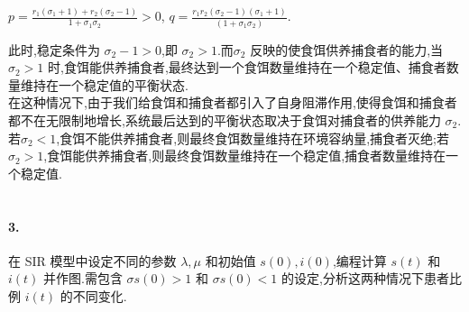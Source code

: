 \documentclass{article}
\begin{document}
    $p=\frac{r_1(\sigma_1 + 1)+r_2(\sigma_2-1)}{1+\sigma_1\sigma_2} > 0$, $q=\frac{r_1r_2(\sigma_2-1)(\sigma_1+1)}{(1+\sigma_1\sigma_2)}$.

    此时,稳定条件为 $\sigma_2-1 > 0$,即 $\sigma_2 > 1$.而$\sigma_2$ 反映的使食饵供养捕食者的能力,当 $\sigma_2 > 1$ 时,食饵能供养捕食者,最终达到一个食饵数量维持在一个稳定值、捕食者数量维持在一个稳定值的平衡状态.\\

    在这种情况下,由于我们给食饵和捕食者都引入了自身阻滞作用,使得食饵和捕食者都不在无限制地增长,系统最后达到的平衡状态取决于食饵对捕食者的供养能力 $\sigma_2$.若$\sigma_2 < 1$,食饵不能供养捕食者,则最终食饵数量维持在环境容纳量,捕食者灭绝;若$\sigma_2 > 1$,食饵能供养捕食者,则最终食饵数量维持在一个稳定值,捕食者数量维持在一个稳定值.\\
~\\

\paragraph{3.}在 SIR 模型中设定不同的参数 $\lambda, \mu$ 和初始值 $s(0), i(0)$,编程计算 $s(t)$ 和 $i(t)$ 并作图.需包含 $\sigma s(0) > 1$ 和 $\sigma s(0) < 1$ 的设定,分析这两种情况下患者比例 $i(t)$ 的不同变化.
\end{document}

